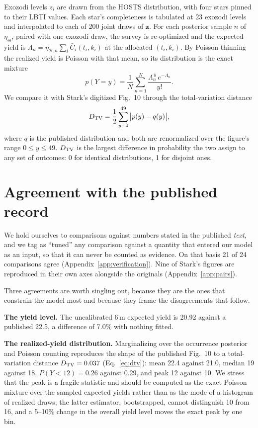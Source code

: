 \documentclass[11pt,a4paper]{article}
\begin{document}
Exozodi levels $z_i$ are drawn from the HOSTS distribution, with four stars pinned to their LBTI
values. Each star's completeness is tabulated at 23 exozodi levels and interpolated to each of
200 joint draws of $\mathbf{z}$. For each posterior sample $n$ of $\eta_\oplus$, paired with
one exozodi draw, the survey is re-optimized and the expected yield is
$\Lambda_n = \eta_{\mathcal{B},n}\sum_i \bar C_i(t_i, k_i)$ at the allocated $(t_i, k_i)$. By
Poisson thinning the realized yield is Poisson with that mean, so its distribution is the exact
mixture
\begin{equation}
p(Y = y) = \frac{1}{N}\sum_{n=1}^{N} \frac{\Lambda_n^{\,y}\,e^{-\Lambda_n}}{y!}.
\label{eq:mixture}
\end{equation}
We compare it with Stark's digitized Fig.~10 through the total-variation distance
\begin{equation}
D_{\rm TV} = \frac{1}{2}\sum_{y=0}^{49}\big|p(y) - q(y)\big|,
\label{eq:dtv}
\end{equation}
where $q$ is the published distribution and both are renormalized over the figure's range
$0 \le y \le 49$. $D_{\rm TV}$ is the largest difference in probability the two assign to any set
of outcomes: 0 for identical distributions, 1 for disjoint ones.

\section{Agreement with the published record}
\label{sec:agreement}

We hold ourselves to comparisons against numbers stated in the published \emph{text}, and we tag
as ``tuned'' any comparison against a quantity that entered our model as an input, so that it can
never be counted as evidence. On that basis 21 of 24 comparisons agree
(Appendix~\ref{app:verification}). Nine of Stark's figures are reproduced in their own axes
alongside the originals (Appendix~\ref{app:pairs}).

Three agreements are worth singling out, because they are the ones that constrain the model most
and because they frame the disagreements that follow.

\textbf{The yield level.} The uncalibrated $6\,$m expected yield is 20.92 against a
published 22.5, a difference of 7.0\% with nothing fitted.

\textbf{The realized-yield distribution.} Marginalizing over the occurrence posterior and
Poisson counting reproduces the shape of the published Fig.~10 to a total-variation distance
$D_{\rm TV} = 0.037$ (Eq.~\ref{eq:dtv}): mean 22.4 against 21.0, median 19 against 18,
$P(Y<12) = 0.26$ against 0.29, and peak 12 against 10. We stress
that the peak is a fragile statistic and should be computed as the exact Poisson mixture over the
sampled expected yields rather than as the mode of a histogram of realized draws; the latter
estimator, bootstrapped, cannot distinguish 10 from 16, and a 5--10\% change in the overall yield
level moves the exact peak by one bin.
\end{document}
